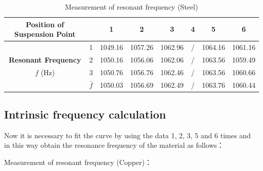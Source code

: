 \documentclass[UTF8]{article}
\begin{document}
\begin{table}[htbp]
    \centering
     \caption{Measurement of resonant frequency (Steel)}
    \begin{tabular}{cccccccc}
        \toprule
        \textbf{Position of Suspension Point} && \textbf{1} & \textbf{2} & \textbf{3}  &\textbf{4} & \textbf{5} & \textbf{6} \\
        \midrule
                                           & 1 & 1049.16 & 1057.26 & 1062.96 & / & 1064.16 & 1061.16\\
         \textbf{Resonant Frequency}       & 2 & 1050.16 & 1056.06 & 1062.06 & / & 1063.56 & 1059.49\\
                $f$ (Hz)                   & 3 & 1050.76 & 1056.76 & 1062.46 & / & 1063.56 & 1060.66\\
                                           &$\bar{f}$  & 1050.03 & 1056.69 & 1062.49 & / & 1063.76 & 1060.44\\
        \bottomrule
    \end{tabular}

    \label{tab:updated-resonant-frequencies}
\end{table}
  
   
   \subsection{Intrinsic frequency calculation}
   Now it is necessary to fit the curve by using the data 1, 2, 3, 5 and 6 times and in this way obtain the resonance frequency of the material as follows：
   
   Measurement of resonant frequency (Copper)：
   
\end{document}
